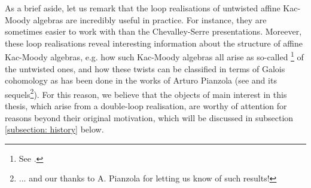         As a brief aside, let us remark that the loop realisations of untwisted affine Kac-Moody algebras are incredibly useful in practice. For instance, they are sometimes easier to work with than the Chevalley-Serre presentations. Moreever, these loop realisations reveal interesting information about the structure of affine Kac-Moody algebras, e.g. how such Kac-Moody algebras all arise as so-called \footnote{See \cite[Chapter 8]{kac_infinite_dimensional_lie_algebras}.} of the untwisted ones, and how these twists can be classified in terms of Galois cohomology as has been done in the works of Arturo Pianzola (see \cite{pianzola_vanishing_of_H1_of_dedekind_rings} and its sequels\footnote{... and our thanks to A. Pianzola for letting us know of such results!}). For this reason, we believe that the objects of main interest in this thesis, which arise from a double-loop realisation, are worthy of attention for reasons beyond their original motivation, which will be discussed in subsection \ref{subsection: history} below.

